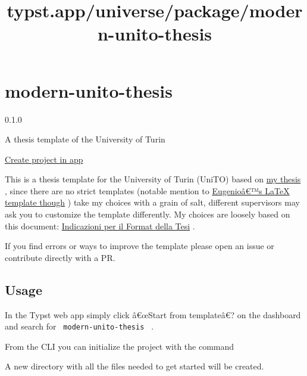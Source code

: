 \title{typst.app/universe/package/modern-unito-thesis}

\label{banner}
\label{template-thumbnail}

\section{modern-unito-thesis}\label{modern-unito-thesis}

{ 0.1.0 }

A thesis template of the University of Turin

\href{/app?template=modern-unito-thesis&version=0.1.0}{Create project in
app}

\label{readme}
This is a thesis template for the University of Turin (UniTO) based on
\href{https://github.com/eduardz1/Bachelor-Thesis}{my thesis} , since
there are no strict templates (notable mention to
\href{https://github.com/esenes/Unito-thesis-template}{Eugenioâ€™s LaTeX
template though} ) take my choices with a grain of salt, different
supervisors may ask you to customize the template differently. My
choices are loosely based on this document:
\href{https://elearning.unito.it/sme/pluginfile.php/29485/mod_folder/content/0/format_TESI_2011-2012.pdf}{Indicazioni
per il Format della Tesi} .

If you find errors or ways to improve the template please open an issue
or contribute directly with a PR.

\subsection{Usage}\label{usage}

In the Typst web app simply click â€œStart from templateâ€? on the
dashboard and search for \texttt{\ modern-unito-thesis\ } .

From the CLI you can initialize the project with the command

\begin{Shaded}
\begin{Highlighting}[]
\end{Highlighting}
\end{Shaded}

A new directory with all the files needed to get started will be
created.

